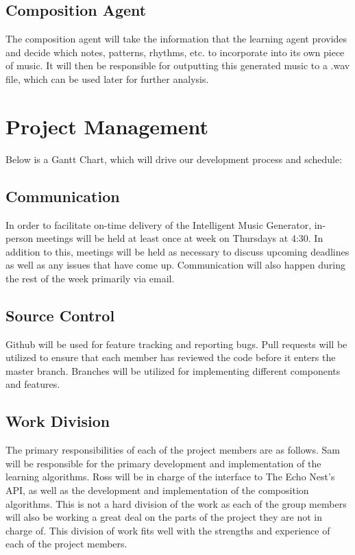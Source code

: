 \documentclass{article}
\begin{document}
\subsection{Composition Agent}
The composition agent will take the information that the learning agent provides and decide which notes, patterns, rhythms, etc. to incorporate into its own piece of music. It will then be responsible for outputting this generated music to a .wav file, which can be used later for further analysis.

\section{Project Management}
Below is a Gantt Chart, which will drive our development process and schedule:
\begin{figure}[ht]
\end{figure}

\subsection{Communication}
In order to facilitate on-time delivery of the Intelligent Music Generator, in-person meetings will be held at least once at week on Thursdays at 4:30. In addition to this, meetings will be held as necessary to discuss upcoming deadlines as well as any issues that have come up. Communication will also happen during the rest of the week primarily via email.

\subsection{Source Control}
Github will be used for feature tracking and reporting bugs.  Pull requests will be utilized to ensure that each member has reviewed the code before it enters the master branch.  Branches will be utilized for implementing different components and features.

\subsection{Work Division}
The primary responsibilities of each of the project members are as follows. Sam will be responsible for the primary development and implementation of the learning algorithms. Ross will be in charge of the interface to The Echo Nest's API, as well as the development and implementation of the composition algorithms. This is not a hard division of the work as each of the group members will also be working a great deal on the parts of the project they are not in charge of. This division of work fits well with the strengths and experience of each of the project members.
\end{document}
